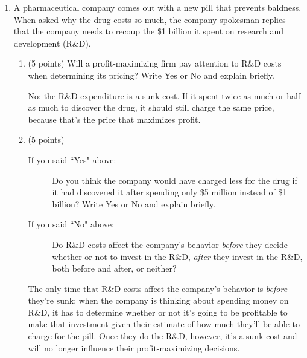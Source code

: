 \documentclass[twoside]{article}
\begin{document}
\begin{enumerate}


\item \begin{EXAM} A pharmaceutical company comes out with a new pill that prevents baldness. When asked why the drug
costs so much, the company spokesman replies that the company needs to recoup the \$1 billion it spent on research and
development (R\&D). \end{EXAM}

    \begin{enumerate}

    \item \begin{EXAM} (5 points) Will a profit-maximizing firm pay attention to R\&D costs when determining its pricing? Write Yes or No and explain briefly.     \end{EXAM}

\begin{KEY}
No: the R\&D expenditure is a sunk cost. If it spent twice as much or half as much to discover the drug, it should still
charge the same price, because that's the price that maximizes profit.
\end{KEY}

    \item \begin{EXAM} (5 points)
        \begin{description}
        \item [If you said ``Yes" above:] Do you think the company would have charged less for the drug if it had
        discovered it after spending only \$5 million instead of \$1 billion? Write Yes or No and explain briefly.
        \item [If you said ``No" above:] Do R\&D costs affect the company's behavior \emph{before} they decide whether or
        not to invest in the R\&D, \emph{after} they invest in the R\&D, both before and after, or neither?
         \end{description}
     \end{EXAM}

\begin{KEY}
The only time that R\&D costs affect the company's behavior is \emph{before} they're sunk: when the company is thinking
about spending money on R\&D, it has to determine whether or not it's going to be profitable to make that investment
given their estimate of how much they'll be able to charge for the pill. Once they do the R\&D, however, it's a sunk cost
and will no longer influence their profit-maximizing decisions.
\end{KEY}


\end{enumerate}
\end{enumerate}
\end{document}
